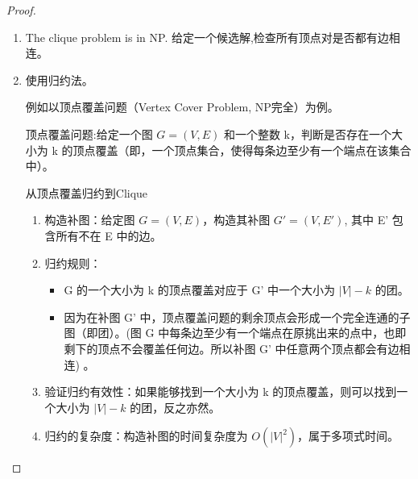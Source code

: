 \documentclass{article}
\begin{document}
\begin{proof}
    \begin{enumerate}
        \item The clique problem is in NP. 给定一个候选解,检查所有顶点对是否都有边相连。
        \item 使用归约法。\par
        例如以顶点覆盖问题（Vertex Cover Problem, NP完全）为例。\par
        顶点覆盖问题:给定一个图 $G=(V,E)$ 和一个整数 k，判断是否存在一个大小为 k 的顶点覆盖（即，一个顶点集合，使得每条边至少有一个端点在该集合中）。\par
        从顶点覆盖归约到Clique
        \begin{enumerate}
            \item 构造补图：给定图 $G=(V,E)$，构造其补图 $G' = (V,E')$, 其中 E' 包含所有不在 E 中的边。
            \item 归约规则：\begin{itemize}
                \item G 的一个大小为 k 的顶点覆盖对应于 G' 中一个大小为 $|V| - k$ 的团。
                \item 因为在补图 G' 中，顶点覆盖问题的剩余顶点会形成一个完全连通的子图（即团）。(图 G 中每条边至少有一个端点在原挑出来的点中，也即剩下的顶点不会覆盖任何边。所以补图 G' 中任意两个顶点都会有边相连) 。           
            \end{itemize}
            \item 验证归约有效性：如果能够找到一个大小为 k 的顶点覆盖，则可以找到一个大小为 $ |V| - k$ 的团，反之亦然。
            \item 归约的复杂度：构造补图的时间复杂度为 $O(|V|^2)$，属于多项式时间。
        \end{enumerate}
    \end{enumerate}
\end{proof}
\end{document}
